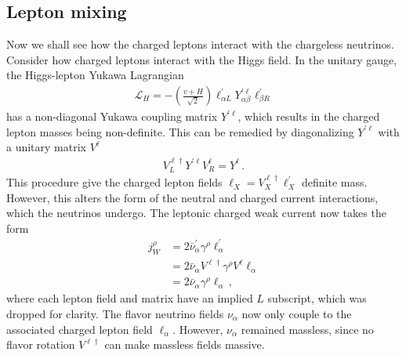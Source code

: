 \subsection{Lepton mixing}
Now we shall see how the charged leptons interact with the chargeless neutrinos.
Consider how charged leptons interact with the Higgs field. In the unitary gauge, the Higgs-lepton Yukawa Lagrangian 
\begin{align}
    \label{eq:YukawaLagrangian}
    \mathcal{L}_{H}=-\left( \frac{v + H}{\sqrt{2}} \right) \ell_{\alpha L}^{\prime} Y_{\alpha \beta}^{\prime \ell} \ell_{\beta R}^{\prime}
\end{align}
has a non-diagonal Yukawa coupling matrix $Y^{\prime \ell}$, which results in the charged lepton masses being non-definite. This can be remedied by diagonalizing $Y^{\prime \ell}$ with a unitary matrix $V^\ell$
\begin{align}\label{eq:leptonYukawaDiag}
    V_{L}^{\ell \dagger} Y^{\prime \ell} V_{R}^{\ell}=Y^{\ell}\,.
\end{align}
This procedure give the charged lepton fields $\ell_{X}=V_{X}^{\ell \dagger} \ell_{X}^{\prime}$ definite mass. 
However, this alters the form of the neutral and charged current interactions, which the neutrinos undergo. The leptonic charged weak current now takes the form
\begin{align}
    \label{eq:j_CC}
    j^\rho_W &= 2 \bar{\nu}^\prime_\alpha \gamma^\rho \ell^\prime_\alpha \nonumber \\
             &= 2 \bar{\nu}_\alpha V^{\ell \dagger} \gamma^\rho V^\ell \ell_\alpha \nonumber \\
             &= 2 \bar{\nu}_\alpha \gamma^\rho \ell_\alpha\,,
\end{align}
where each lepton field and matrix have an implied $L$ subscript, which was dropped for clarity. The flavor neutrino fields $\nu_\alpha$ now only couple to the associated charged lepton field $\ell_\alpha$. However, 
$\nu_\alpha$ remained massless, since no flavor rotation $V^{\ell \dagger}$ can make massless fields massive.
% 
% 
% 